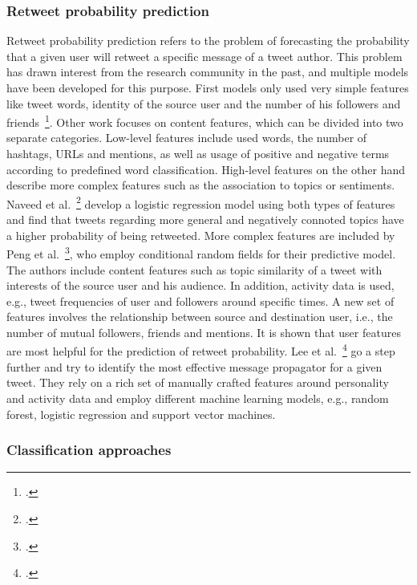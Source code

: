 \subsubsection{Retweet probability prediction}

Retweet probability prediction refers to the problem of forecasting the
probability that a given user will retweet a specific message of a tweet author.
This problem has drawn interest from the research community in the past, and
multiple models have been developed for this purpose.
First models only used very simple features like tweet words, identity of the
source user and the number of his followers and friends~\footcite{Zaman2010}.
Other work focuses on content features, which can be divided into two separate
categories.
Low-level features include used words, the number of hashtags, URLs and mentions,
as well as usage of positive and negative terms according to predefined word 
classification.
High-level features on the other hand describe more complex features such as
the association to topics or sentiments.
Naveed et al.~\footcite{Naveed2011} develop a logistic regression model using
both types of features and find that tweets regarding more general and 
negatively connoted topics have a higher probability of being retweeted.
More complex features are included by Peng et al.~\footcite{Peng2011},
who employ conditional random fields for their predictive model.
The authors include content features such as topic similarity of a tweet with 
interests of the source user and his audience.
In addition, activity data is used, e.g., tweet frequencies of user and
followers around specific times.
A new set of features involves the relationship between source and destination
user, i.e., the number of mutual followers, friends and mentions.
It is shown that user features are most helpful for the prediction of
retweet probability.
Lee et al.~\footcite{Lee2014} go a step further and try to identify the most
effective message propagator for a given tweet.
They rely on a rich set of manually crafted features around personality and activity data
and employ different machine learning models, e.g., random forest, logistic
regression and support vector machines.

\subsubsection{Classification approaches}

